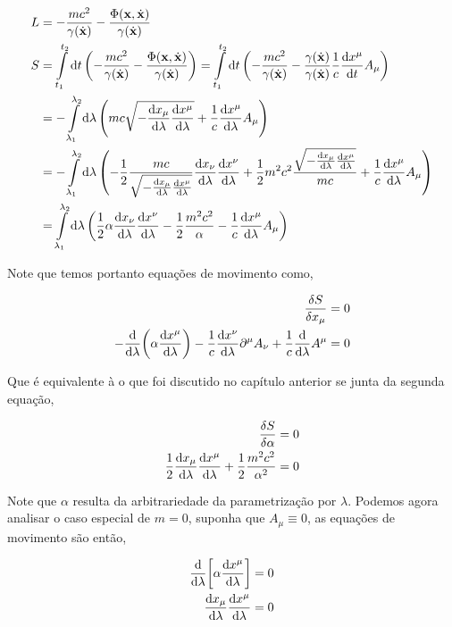 \documentclass[twoside]{amsart}
\numberwithin{equation}{section}
\begin{document}
\begin{align}
    L&=-\frac{mc^2}{\gamma\qty(\dot{\vb x})}-\frac{\Phi\qty(\vb x,\dot{\vb x})}{\gamma\qty(\dot{\vb x})}\\
    S&=\int\limits_{t_1}^{t_2}\dd{t}\qty(-\frac{mc^2}{\gamma\qty(\dot{\vb x})}-\frac{\Phi\qty(\vb x,\dot{\vb x})}{\gamma\qty(\dot{\vb x})})=\int\limits_{t_1}^{t_2}\dd{t}\qty(-\frac{mc^2}{\gamma\qty(\dot{\vb x})}-\frac{\gamma\qty(\dot{\vb x})}{\gamma\qty(\dot{\vb x})}\frac1c\dv{x^\mu}{t}A_\mu)\\
    &=-\int\limits_{\lambda_1}^{\lambda_2}\dd{\lambda}\qty(mc\sqrt{-\dv{x_\mu}{\lambda}\dv{x^\mu}{\lambda}}+\frac1c\dv{x^\mu}{\lambda}A_\mu)\\
    &=-\int\limits_{\lambda_1}^{\lambda_2}\dd{\lambda}\qty(-\frac12\frac{mc}{\sqrt{-\dv{x_\mu}{\lambda}\dv{x^\mu}{\lambda}}}\dv{x_\nu}{\lambda}\dv{x^\nu}{\lambda}+\frac12 m^2c^2\frac{\sqrt{-\dv{x_\mu}{\lambda}\dv{x^\mu}{\lambda}}}{mc}+\frac1c\dv{x^\mu}{\lambda}A_\mu)\\
    &=\int\limits_{\lambda_1}^{\lambda_2}\dd{\lambda}\qty(\frac12\alpha\dv{x_\nu}{\lambda}\dv{x^\nu}{\lambda}-\frac12 \frac{m^2c^2}{\alpha}-\frac1c\dv{x^\mu}{\lambda}A_\mu)
\end{align}

Note que temos portanto equações de movimento como,

\begin{align}
    \fdv{S}{x_\mu}&=0\\
    -\dv{}{\lambda}\qty(\alpha\dv{x^\mu}{\lambda})-\frac1c\dv{x^\nu}{\lambda}\partial^\mu A_\nu+\frac1c\dv{}{\lambda}A^\mu&=0
\end{align}

Que é equivalente à o que foi discutido no capítulo anterior se junta da segunda equação,

\begin{align}
    \fdv{S}{\alpha}&=0\\
    \frac12\dv{x_\mu}{\lambda}\dv{x^\mu}{\lambda}+\frac12\frac{m^2c^2}{\alpha^2}&=0
\end{align}

Note que $\alpha$ resulta da arbitrariedade da parametrização por $\lambda$. Podemos agora analisar o caso especial de $m=0$, suponha que $A_\mu\equiv 0$, as equações de movimento são então,

\begin{align}
    \dv{}{\lambda}\qty[\alpha\dv{x^\mu}{\lambda}]&=0\\
    \dv{x_\mu}{\lambda}\dv{x^\mu}{\lambda}&=0
\end{align}
\end{document}
